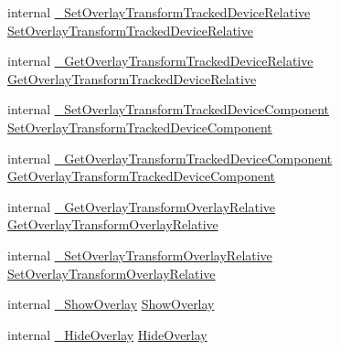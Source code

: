 \begin{DoxyCompactItemize}
\item 
internal \mbox{\hyperlink{struct_valve_1_1_v_r_1_1_i_v_r_overlay_ac83c23b8afe439475d80d3e64db9878d}{\+\_\+\+Set\+Overlay\+Transform\+Tracked\+Device\+Relative}} \mbox{\hyperlink{struct_valve_1_1_v_r_1_1_i_v_r_overlay_a47966e22a56e321c524388d12978f480}{Set\+Overlay\+Transform\+Tracked\+Device\+Relative}}
\item 
internal \mbox{\hyperlink{struct_valve_1_1_v_r_1_1_i_v_r_overlay_aab0d31c4d5c91a030e4625b2f355f126}{\+\_\+\+Get\+Overlay\+Transform\+Tracked\+Device\+Relative}} \mbox{\hyperlink{struct_valve_1_1_v_r_1_1_i_v_r_overlay_a1907b5f98158ff8ae8cedc7e84ef75f4}{Get\+Overlay\+Transform\+Tracked\+Device\+Relative}}
\item 
internal \mbox{\hyperlink{struct_valve_1_1_v_r_1_1_i_v_r_overlay_a3d145314a3a3a2bd5bf35892b56db863}{\+\_\+\+Set\+Overlay\+Transform\+Tracked\+Device\+Component}} \mbox{\hyperlink{struct_valve_1_1_v_r_1_1_i_v_r_overlay_a37518daa650c2828fe110001964fa4dd}{Set\+Overlay\+Transform\+Tracked\+Device\+Component}}
\item 
internal \mbox{\hyperlink{struct_valve_1_1_v_r_1_1_i_v_r_overlay_aec5e286ed41c5cad482f21b6be152433}{\+\_\+\+Get\+Overlay\+Transform\+Tracked\+Device\+Component}} \mbox{\hyperlink{struct_valve_1_1_v_r_1_1_i_v_r_overlay_a3051e5758a5ae3b14ce61029977f90ab}{Get\+Overlay\+Transform\+Tracked\+Device\+Component}}
\item 
internal \mbox{\hyperlink{struct_valve_1_1_v_r_1_1_i_v_r_overlay_a8cc0a138c05e5059bd41540d8f24800d}{\+\_\+\+Get\+Overlay\+Transform\+Overlay\+Relative}} \mbox{\hyperlink{struct_valve_1_1_v_r_1_1_i_v_r_overlay_a93575457dd3040dfd25c75ecd2b3fc0f}{Get\+Overlay\+Transform\+Overlay\+Relative}}
\item 
internal \mbox{\hyperlink{struct_valve_1_1_v_r_1_1_i_v_r_overlay_a316bb946cf3419e40e836a5876bc7522}{\+\_\+\+Set\+Overlay\+Transform\+Overlay\+Relative}} \mbox{\hyperlink{struct_valve_1_1_v_r_1_1_i_v_r_overlay_aecbc1516a97eb841928028afd4536918}{Set\+Overlay\+Transform\+Overlay\+Relative}}
\item 
internal \mbox{\hyperlink{struct_valve_1_1_v_r_1_1_i_v_r_overlay_a4790f23bb779178e96a7b54765d0406f}{\+\_\+\+Show\+Overlay}} \mbox{\hyperlink{struct_valve_1_1_v_r_1_1_i_v_r_overlay_a7c23f61f2590e17027d114b269435d70}{Show\+Overlay}}
\item 
internal \mbox{\hyperlink{struct_valve_1_1_v_r_1_1_i_v_r_overlay_aa37a48da1e178713f92a56c045d5b50e}{\+\_\+\+Hide\+Overlay}} \mbox{\hyperlink{struct_valve_1_1_v_r_1_1_i_v_r_overlay_afc24a9682c1ec15721de6708392825e3}{Hide\+Overlay}}

\end{DoxyCompactItemize}
